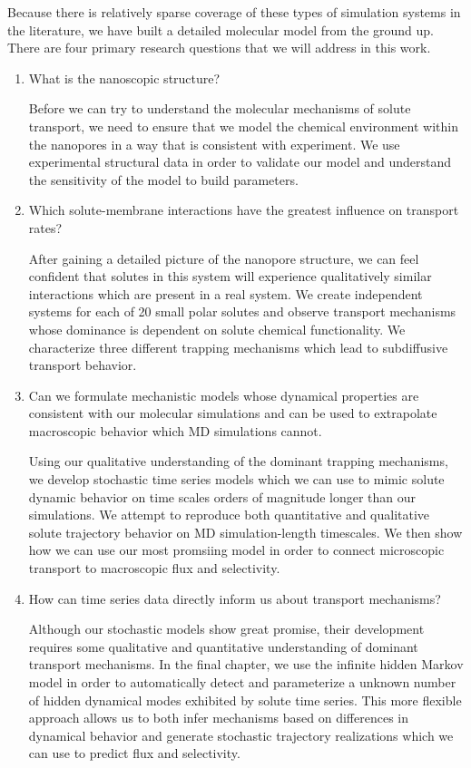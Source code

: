   Because there is relatively sparse coverage of these types of simulation systems in 
  the literature, we have built a detailed molecular model from the ground up. There 
  are four primary research questions that we will address in this work.
  \begin{enumerate}
    \item What is the nanoscopic structure?

    	  Before we can try to understand the molecular mechanisms of solute
    	  transport, we need to ensure that we model the chemical environment
    	  within the nanopores in a way that is consistent with experiment.
    	  We use experimental structural data in order to validate our model and
    	  understand the sensitivity of the model to build parameters.

    \item Which solute-membrane interactions have the greatest influence on transport rates?
    	  
    	  After gaining a detailed picture of the nanopore structure, we can 
    	  feel confident that solutes in this system will experience qualitatively 
    	  similar interactions which are present in a real system. We create independent
    	  systems for each of 20 small polar solutes and observe transport mechanisms
    	  whose dominance is dependent on solute chemical functionality. We characterize
    	  three different trapping mechanisms which lead to subdiffusive transport behavior.
    	  
    \item Can we formulate mechanistic models whose dynamical properties are consistent with our
    molecular simulations and can be used to extrapolate macroscopic behavior which MD simulations cannot.

		  Using our qualitative understanding of the dominant trapping mechanisms,
    	  we develop stochastic time series models which we can use to mimic solute dynamic
    	  behavior on time scales orders of magnitude longer than our simulations. 
    	  We attempt to reproduce both quantitative and qualitative solute trajectory
    	  behavior on MD simulation-length timescales. We then show how we can use our 
    	  most promsiing model in order to connect microscopic transport to macroscopic
    	  flux and selectivity.

    \item How can time series data directly inform us about transport mechanisms?
    	
    	  Although our stochastic models show great promise, their development requires
    	  some qualitative and quantitative understanding of dominant transport
    	  mechanisms. In the final chapter, we use the infinite hidden Markov model in
    	  order to automatically detect and parameterize a unknown number of hidden 
    	  dynamical modes exhibited by solute time series. This more flexible approach
    	  allows us to both infer mechanisms based on differences in dynamical behavior
    	  and generate stochastic trajectory realizations which we can use to predict
    	  flux and selectivity. 
 
  \end{enumerate} 
  
